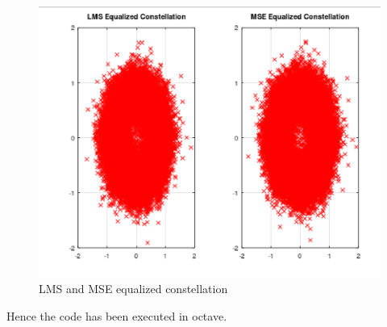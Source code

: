 \begin{figure}[!ht]
\centering
\includegraphics[width=\columnwidth]{./LMS_equalizer_octave/figs/lms.eps}
\caption{LMS and MSE equalized constellation}
\label{fig:lms_mse}
\end{figure}
Hence the code has been executed in octave.
